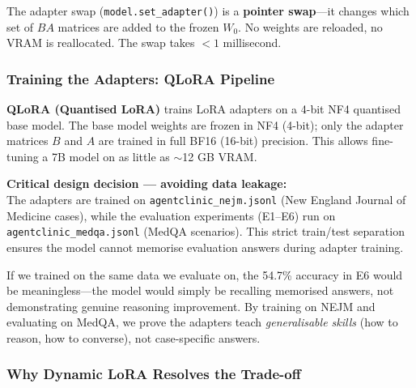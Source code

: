 The adapter swap (\texttt{model.set\_adapter()}) is a \textbf{pointer swap}---it changes which set of $BA$ matrices are added to the frozen $W_0$. No weights are reloaded, no VRAM is reallocated. The swap takes $< 1$ millisecond.

\subsubsection{Training the Adapters: QLoRA Pipeline}

\begin{acadbox}[\textcolor{white}{Academic Definition}]
\textbf{QLoRA (Quantised LoRA)} trains LoRA adapters on a 4-bit NF4 quantised base model. The base model weights are frozen in NF4 (4-bit); only the adapter matrices $B$ and $A$ are trained in full BF16 (16-bit) precision. This allows fine-tuning a 7B model on as little as $\sim$12 GB VRAM.

\textbf{Critical design decision --- avoiding data leakage:}\\
The adapters are trained on \texttt{agentclinic\_nejm.jsonl} (New England Journal of Medicine cases), while the evaluation experiments (E1--E6) run on \texttt{agentclinic\_medqa.jsonl} (MedQA scenarios). This strict train/test separation ensures the model cannot memorise evaluation answers during adapter training.
\end{acadbox}

\begin{mattersbox}[\textcolor{white}{Why It Matters for This Thesis}]
If we trained on the same data we evaluate on, the 54.7\% accuracy in E6 would be meaningless---the model would simply be recalling memorised answers, not demonstrating genuine reasoning improvement. By training on NEJM and evaluating on MedQA, we prove the adapters teach \textit{generalisable skills} (how to reason, how to converse), not case-specific answers.
\end{mattersbox}

\subsubsection{Why Dynamic LoRA Resolves the Trade-off}

